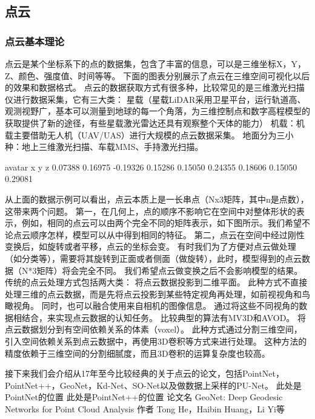 \documentclass{amsart}
\begin{document}
\subsection{点云}
\label{sec:03}

\subsubsection{点云基本理论}
\label{sec:04}

点云是某个坐标系下的点的数据集，包含了丰富的信息，可以是三维坐标X，Y，Z、颜色、强度值、时间等等。
下面的图表分别展示了点云在三维空间可视化以后的效果和数据格式。
点云的数据获取方式有很多种，比较常见的是三维激光扫描仪进行数据采集，它有三大类：
    星载（星载LiDAR采用卫星平台，运行轨道高、观测视野广，基本可以测量到地球的每一个角落，为三维控制点和数字高程模型的获取提供了新的途径，有些星载激光雷达还具有观察整个天体的能力）
    机载：机载主要借助无人机（UAV/UAS）进行大规模的点云数据采集。
    地面分为三小种：地上三维激光扫描、车载MMS、手持激光扫描。

avatar
x       y       z
0.07388         0.16975         -0.19326
0.15286         0.15050         0.24355
0.18606         0.15050         0.29081

从上面的数据示例可以看出，点云本质上是一长串点（Nx3矩阵，其中n是点数），这带来两个问题。
第一，在几何上，点的顺序不影响它在空间中对整体形状的表示，例如，相同的点云可以由两个完全不同的矩阵表示，如下图所示。我们希望不论点云顺序怎样，模型可以从中得到相同的特征。
第二，点云在空间中经过刚性变换后，如旋转或者平移，点云的坐标会变。
有时我们为了方便对点云做处理（如分类等），需要将其旋转到正面或者侧面（做旋转），此时，模型得到的点云数据（N*3矩阵）将会完全不同。
我们希望点云做变换之后不会影响模型的结果。
传统的点云处理方式包括两大类：
将点云数据投影到二维平面。
此种方式不直接处理三维的点云数据，而是先将点云投影到某些特定视角再处理，如前视视角和鸟瞰视角。
同时，也可以融合使用来自相机的图像信息。
通过将这些不同视角的数据相结合，来实现点云数据的认知任务。
比较典型的算法有MV3D和AVOD。
将点云数据划分到有空间依赖关系的体素（voxel）。
此种方式通过分割三维空间，引入空间依赖关系到点云数据中，再使用3D卷积等方式来进行处理。
这种方法的精度依赖于三维空间的分割细腻度，而且3D卷积的运算复杂度也较高。

接下来我们会介绍从17年至今比较经典的关于点云的论文，包括PointNet，PointNet++，GeoNet，Kd-Net、SO-Net以及做数据上采样的PU-Net。
此处是PointNet的位置
此处是PointNet++的位置
    论文名 GeoNet: Deep Geodesic Networks for Point Cloud Analysis
    作者 Tong He，Haibin Huang，Li Yi等
\end{document}
